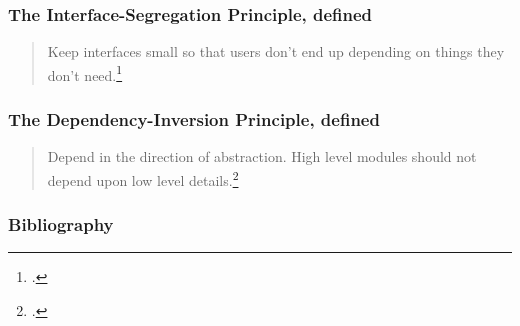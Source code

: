\documentclass[aspectratio=169]{beamer}
\begin{document}

\begin{frame}
  \frametitle{The Interface-Segregation Principle, defined}

  \begin{quote}
    Keep interfaces small so that users don't end up depending on things they
    don't need.\footnote{\cite{solid-relevance}.}
  \end{quote}
\end{frame}


\begin{frame}
  \frametitle{The Dependency-Inversion Principle, defined}

  \begin{quote}
    Depend in the direction of abstraction. High level modules should not depend
    upon low level details.\footnote{\cite{solid-relevance}.}
  \end{quote}
\end{frame}


\begin{frame}
  \frametitle{Bibliography}
  \begin{centering}
    \printbibliography
  \end{centering}
\end{frame}
\end{document}
